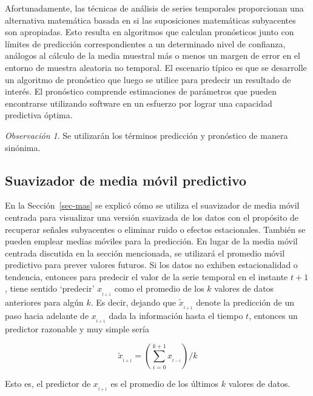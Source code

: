 \documentclass[
  us-letterpaper,
]{scrreprt}
\theoremstyle{definition}
\theoremstyle{plain}
\theoremstyle{plain}
\theoremstyle{definition}
\theoremstyle{remark}
\newtheorem*{remark}{Observación}
\begin{document}
Afortunadamente, las técnicas de análisis de series temporales
proporcionan una alternativa matemática basada en si las suposiciones
matemáticas subyacentes son apropiadas. Esto resulta en algoritmos que
calculan pronósticos junto con límites de predicción correspondientes a
un determinado nivel de confianza, análogos al cálculo de la media
muestral más o menos un margen de error en el entorno de muestra
aleatoria no temporal. El escenario típico es que se desarrolle un
algoritmo de pronóstico que luego se utilice para predecir un resultado
de interés. El pronóstico comprende estimaciones de parámetros que
pueden encontrarse utilizando software en un esfuerzo por lograr una
capacidad predictiva óptima.

\begin{remark}
Se utilizarán los términos predicción y pronóstico de manera sinónima.
\end{remark}

\subsection{Suavizador de media móvil
predictivo}\label{suavizador-de-media-muxf3vil-predictivo}

En la Sección~\ref{sec-mas} se explicó cómo se utiliza el suavizador de
media móvil centrada para visualizar una versión suavizada de los datos
con el propósito de recuperar señales subyacentes o eliminar ruido o
efectos estacionales. También se pueden emplear medias móviles para la
predicción. En lugar de la media móvil centrada discutida en la sección
mencionada, se utilizará el promedio móvil predictivo para prever
valores futuros. Si los datos no exhiben estacionalidad o tendencia,
entonces para predecir el valor de la serie temporal en el instante
\(t+1\), tiene sentido `predecir' \(x_{_{t+1}}\) como el promedio de los
\(k\) valores de datos anteriores para algún \(k\). Es decir, dejando
que \(\tilde{x}_{_{t+1}}\) denote la predicción de un paso hacia
adelante de \(x_{_{t+1}}\) dada la información hasta el tiempo \(t\),
entonces un predictor razonable y muy simple sería

\[
\tilde{x}_{_{t+1}}=\left(\sum\limits_{i=0}^{k+1}x_{_{t-i}}\right)/k
\]

Esto es, el predictor de \(x_{_{t+1}}\) es el promedio de los últimos
\(k\) valores de datos.
\end{document}
